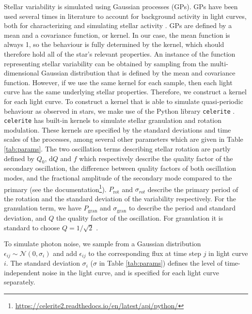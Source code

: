Stellar variability is simulated using Gaussian processes (GPs). GPs have been used several times in literature to account for background activity in light curves, both for characterizing and simulating stellar activity \citep{barros2020improving, zucker2018shallow}. GPs are defined by a mean and a covariance function, or kernel. In our case, the mean function is always 1, so the behaviour is fully determined by the kernel, which should therefore hold all of the star's relevant properties. An instance of the function representing stellar variability can be obtained by sampling from the multi-dimensional Gaussian distribution that is defined by the mean and covariance function. However, if we use the same kernel for each sample, then each light curve has the same underlying stellar properties. Therefore, we construct a kernel for each light curve. To construct a kernel that is able to simulate quasi-periodic behaviour as observed in stars, we make use of the Python library \texttt{celerite} \citep{foreman2017fast}.  \texttt{celerite} has built-in kernels to simulate stellar granulation and rotation modulation. These kernels are specified by the standard deviations and time scales of the processes, among several other parameters which are given in Table \ref{tab:params}. The two oscillation terms describing stellar rotation are partly defined by $Q_0$, $\text{d}Q$ and $f$ which respectively describe the quality factor of the secondary oscillation, the difference between quality factors of both oscillation modes, and the fractional amplitude of the secondary mode compared to the primary (see the documentation\footnote{\url{https://celerite2.readthedocs.io/en/latest/api/python/}}). $P_{\text{rot}}$ and $\sigma_{rot}$ describe the primary period of the rotation and the standard deviation of the variability respectively. For the granulation term, we have $P_\text{gran}$ and $\sigma_\text{gran}$ to describe the period and standard deviation, and $Q$ the quality factor of the oscillation. For granulation it is standard to choose $Q=1/\sqrt{2}$ .

To simulate photon noise, we sample from a Gaussian distribution $\epsilon_{ij} \sim \mathcal{N}(0, \sigma_i)$ and add $\epsilon_{ij}$ to the corresponding flux at time step $j$ in light curve $i$. The standard deviation $\sigma_i$ ($\sigma$ in Table \ref{tab:params}) defines the level of time-independent noise in the light curve, and is specified for each light curve separately. 

